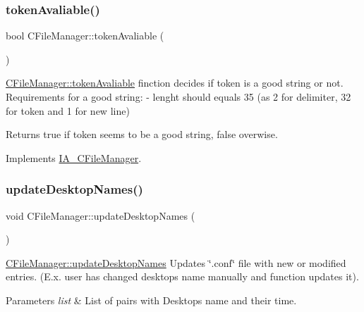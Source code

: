 \subsubsection{\texorpdfstring{token\+Avaliable()}{tokenAvaliable()}}
{\footnotesize\ttfamily bool C\+File\+Manager\+::token\+Avaliable (\begin{DoxyParamCaption}{ }\end{DoxyParamCaption})\hspace{0.3cm}{\ttfamily [virtual]}}



\hyperlink{classCFileManager_ab509134180d95af83a5ad7bd51f8f9ed}{C\+File\+Manager\+::token\+Avaliable} finction decides if token is a good string or not. Requirements for a good string\+: -\/ lenght should equals 35 (as 2 for delimiter, 32 for token and 1 for new line) 

\begin{DoxyReturn}{Returns}
true if token seems to be a good string, false overwise. 
\end{DoxyReturn}


Implements \hyperlink{classIA__CFileManager}{I\+A\+\_\+\+C\+File\+Manager}.

\mbox{\label{classCFileManager_af7a175f29201617ed7d299747d5a3e0f}} 
\subsubsection{\texorpdfstring{update\+Desktop\+Names()}{updateDesktopNames()}}
{\footnotesize\ttfamily void C\+File\+Manager\+::update\+Desktop\+Names (\begin{DoxyParamCaption}\item[{Q\+List$<$ Q\+Pair$<$ Q\+String, Q\+String $>$$>$}]{ }\end{DoxyParamCaption})\hspace{0.3cm}{\ttfamily [virtual]}}



\hyperlink{classCFileManager_af7a175f29201617ed7d299747d5a3e0f}{C\+File\+Manager\+::update\+Desktop\+Names} Updates \char`\"{}.\+conf\char`\"{} file with new or modified entries. (E.\+x. user has changed desktop\textquotesingle{}s name manually and function updates it). 


\begin{DoxyParams}{Parameters}
{\em list} & List of pairs with Desktop\textquotesingle{}s name and their time. \\
\hline
\end{DoxyParams}



